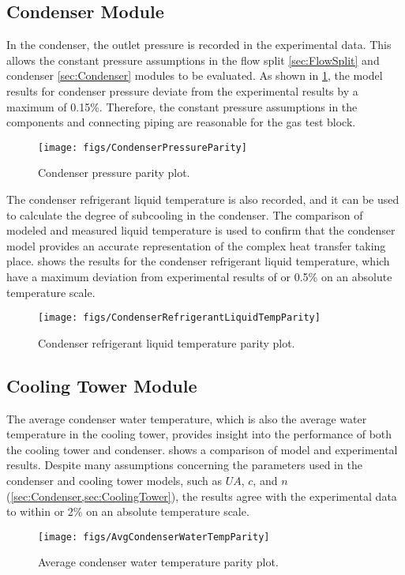 \subsection{Condenser Module} \label{sec:condresult}
In the condenser, the outlet pressure is recorded in the experimental data.
This allows the constant pressure assumptions in the flow split \cref{sec:FlowSplit}
and condenser \cref{sec:Condenser} modules to be evaluated.
As shown in \cref{fig:CondPressParity}, the model results for condenser pressure
deviate from the experimental results by a maximum of 0.15\%.
Therefore, the constant pressure assumptions in the components
and connecting piping are reasonable for the  gas test block.
\begin{figure}[tbp]
  \centering
  \texttt{[image: figs/CondenserPressureParity]}
  \caption{Condenser pressure parity plot.}
  \label{fig:CondPressParity}
\end{figure}

The condenser refrigerant liquid temperature is also recorded,
and it can be used to calculate the degree of subcooling in the condenser.
The comparison of modeled and measured liquid temperature is 
used to confirm that the condenser model provides an
accurate representation of the complex heat transfer taking place.
 shows the results for the condenser
refrigerant liquid temperature, which have a maximum deviation from
experimental results of  or 0.5\% on an absolute temperature scale.
\begin{figure}[tbp]
  \centering
  \texttt{[image: figs/CondenserRefrigerantLiquidTempParity]}
  \caption{Condenser refrigerant liquid temperature parity plot.}
  \label{fig:CondRefLiqTempParity}
\end{figure}

\subsection{Cooling Tower Module}
The average condenser water temperature, which is also the 
average water temperature in the cooling tower, provides insight
into the performance of both the cooling tower and condenser.
 shows a comparison of model and
experimental results.
Despite many assumptions concerning the parameters used in the condenser
and cooling tower models, such as $UA$, $c$, and $n$ (\cref{sec:Condenser,sec:CoolingTower}),
the results agree with the experimental data to within 
or 2\% on an absolute temperature scale.
\begin{figure}[tbp]
  \centering
  \texttt{[image: figs/AvgCondenserWaterTempParity]}
  \caption{Average condenser water temperature parity plot.}
  \label{fig:AvgCondWatTempParity}
\end{figure}

